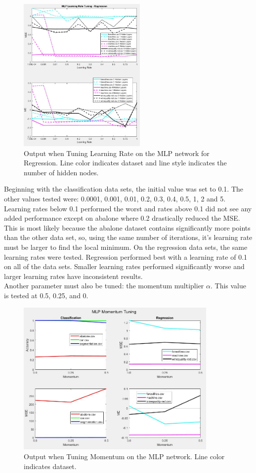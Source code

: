\documentclass[twoside,10pt]{article}
\begin{document}
\begin{figure}[h]
	\centering
	\includegraphics[height=3in]{FINAL_FIGS/MLP_LR_TUNING_REG.JPG}
	\caption{Output when Tuning Learning Rate on the MLP network for Regression. Line color indicates dataset and line style indicates the number of hidden nodes.}
\end{figure}
Beginning with the classification data sets, the initial value was set to 0.1. The other values tested were: 0.0001, 0.001, 0.01, 0.2, 0.3, 0.4, 0.5, 1, 2 and 5. Learning rates below 0.1 performed the worst and rates above 0.1 did not see any added performance except on abalone where 0.2 drastically reduced the MSE. This is most likely because the abalone dataset contains significantly more points than the other data set, so, using the same number of iterations, it's learning rate must be larger to find the local minimum.
On the regression data sets, the same learning rates were tested. Regression performed best with a learning rate of 0.1 on all of the data sets. Smaller learning rates performed significantly worse and larger learning rates have inconsistent results. \\
Another parameter must also be tuned: the momentum multiplier $\alpha$. This value is tested at 0.5, 0.25, and 0. \\
\begin{figure}[h]
	\centering
	\includegraphics[height=3in]{FINAL_FIGS/MLP_MOMENTUM.JPG}
	\caption{Output when Tuning Momentum on the MLP network. Line color indicates dataset.}
\end{figure}
\end{document}
